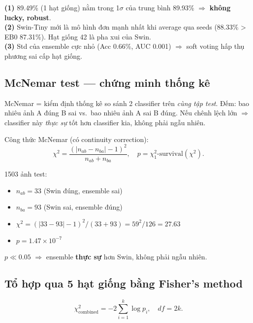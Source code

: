 \documentclass[11pt,a4paper]{article}
\begin{document}
\begin{idea}
\textbf{(1)} 89.49\% (1 hạt giống) nằm trong 1$\sigma$ của trung bình 89.93\% $\Rightarrow$ \textbf{không lucky, robust}.\\
\textbf{(2)} Swin-Tiny mới là mô hình đơn mạnh nhất khi average qua seeds (88.33\% > EB0 87.31\%). Hạt giống 42 là pha xui của Swin.\\
\textbf{(3)} Std của ensemble cực nhỏ (Acc 0.66\%, AUC 0.001) $\Rightarrow$ soft voting hấp thụ phương sai cấp hạt giống.
\end{idea}

\subsection{McNemar test --- chứng minh thống kê}

\begin{simple}
McNemar = kiểm định thống kê so sánh 2 classifier trên \textit{cùng tập test}. Đếm: bao nhiêu ảnh A đúng B sai vs.\ bao nhiêu ảnh A sai B đúng. Nếu chênh lệch lớn $\Rightarrow$ classifier này \textit{thực sự} tốt hơn classifier kia, không phải ngẫu nhiên.
\end{simple}

Công thức McNemar (có continuity correction):
\[
  \chi^2 = \frac{(|n_{ab} - n_{ba}| - 1)^2}{n_{ab} + n_{ba}}, \quad p = \chi^2_1\text{-survival}(\chi^2).
\]

\begin{example}
1503 ảnh test:
\begin{itemize}[leftmargin=*]
  \item $n_{ab} = 33$ (Swin đúng, ensemble sai)
  \item $n_{ba} = 93$ (Swin sai, ensemble đúng)
  \item $\chi^2 = (|33-93| - 1)^2 / (33+93) = 59^2 / 126 = 27.63$
  \item $p = 1.47 \times 10^{-7}$
\end{itemize}
$p \ll 0.05$ $\Rightarrow$ ensemble \textbf{thực sự} hơn Swin, không phải ngẫu nhiên.
\end{example}

\subsection{Tổ hợp qua 5 hạt giống bằng Fisher's method}

\[
  \chi^2_{\text{combined}} = -2 \sum_{i=1}^k \log p_i, \quad df = 2k.
\]
\end{document}
